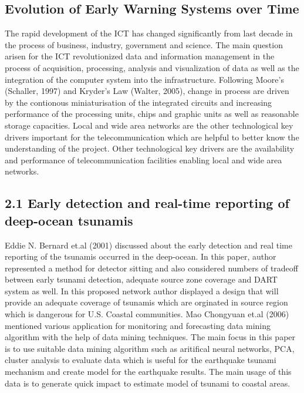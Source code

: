 \subsection{Evolution of  Early Warning Systems over Time}
The rapid development of the ICT has changed significantly from last decade in the process of business, industry, government and science.  The main question arisen  for the ICT revolutionized data and information management in the process of acquisition, processing, analysis and visualization of data as well as the integration of the computer system into the infrastructure. Following Moore’s (Schaller, 1997) and Kryder’s Law (Walter, 2005), change in process are driven by the contionous miniaturisation of the integrated circuits and increasing performance of the processing units, chips  and graphic units as well as reasonable storage capacities.  Local and wide area networks are the other  technological key drivers important for the telecommunication which are helpful to better know the understanding of the project. Other technological key drivers are the availability and performance of telecommunication facilities enabling local and wide area networks. 
 \subsection{2.1 Early detection and real-time reporting of deep-ocean tsunamis}
 
Eddie N. Bernard et.al (2001) discussed about the  early detection and real time reporting of the tsunamis occurred in the deep-ocean. In this paper, author represented a  method for detector sitting and also considered numbers of tradeoff between early tsunami detection, adequate source zone coverage  and DART system as well. In this proposed network author  displayed a design that will provide an adequate coverage of tsunamis which are orginated in source region  which is dangerous for U.S. Coastal communities.  
Mao Chongyuan et.al (2006)  mentioned various application  for monitoring and forecasting data mining algorithm with the help of data mining techniques.  The main focus in this paper is to use suitable data mining algorithm such as  aritifical neural networks, PCA, cluster analysis to evaluate  data  which is useful  for the  earthquake tsunami mechanism  and create model for the earthquake results. The main usage of this data is to generate quick impact to estimate model of tsunami to coastal areas.


